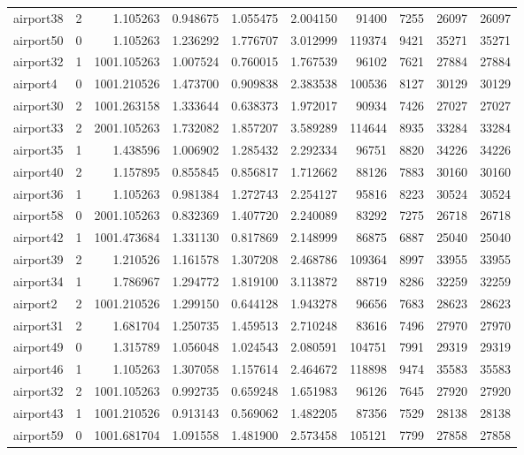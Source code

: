\begin{longtable}{|l|r|r|r|r|r|r|r|r|r|}
airport38 & 2 & 1.105263 & 0.948675 & 1.055475 & 2.004150 & 91400 & 7255 & 26097 & 26097 \\
airport50 & 0 & 1.105263 & 1.236292 & 1.776707 & 3.012999 & 119374 & 9421 & 35271 & 35271 \\
airport32 & 1 & 1001.105263 & 1.007524 & 0.760015 & 1.767539 & 96102 & 7621 & 27884 & 27884 \\
airport4 & 0 & 1001.210526 & 1.473700 & 0.909838 & 2.383538 & 100536 & 8127 & 30129 & 30129 \\
airport30 & 2 & 1001.263158 & 1.333644 & 0.638373 & 1.972017 & 90934 & 7426 & 27027 & 27027 \\
airport33 & 2 & 2001.105263 & 1.732082 & 1.857207 & 3.589289 & 114644 & 8935 & 33284 & 33284 \\
airport35 & 1 & 1.438596 & 1.006902 & 1.285432 & 2.292334 & 96751 & 8820 & 34226 & 34226 \\
airport40 & 2 & 1.157895 & 0.855845 & 0.856817 & 1.712662 & 88126 & 7883 & 30160 & 30160 \\
airport36 & 1 & 1.105263 & 0.981384 & 1.272743 & 2.254127 & 95816 & 8223 & 30524 & 30524 \\
airport58 & 0 & 2001.105263 & 0.832369 & 1.407720 & 2.240089 & 83292 & 7275 & 26718 & 26718 \\
airport42 & 1 & 1001.473684 & 1.331130 & 0.817869 & 2.148999 & 86875 & 6887 & 25040 & 25040 \\
airport39 & 2 & 1.210526 & 1.161578 & 1.307208 & 2.468786 & 109364 & 8997 & 33955 & 33955 \\
airport34 & 1 & 1.786967 & 1.294772 & 1.819100 & 3.113872 & 88719 & 8286 & 32259 & 32259 \\
airport2 & 2 & 1001.210526 & 1.299150 & 0.644128 & 1.943278 & 96656 & 7683 & 28623 & 28623 \\
airport31 & 2 & 1.681704 & 1.250735 & 1.459513 & 2.710248 & 83616 & 7496 & 27970 & 27970 \\
airport49 & 0 & 1.315789 & 1.056048 & 1.024543 & 2.080591 & 104751 & 7991 & 29319 & 29319 \\
airport46 & 1 & 1.105263 & 1.307058 & 1.157614 & 2.464672 & 118898 & 9474 & 35583 & 35583 \\
airport32 & 2 & 1001.105263 & 0.992735 & 0.659248 & 1.651983 & 96126 & 7645 & 27920 & 27920 \\
airport43 & 1 & 1001.210526 & 0.913143 & 0.569062 & 1.482205 & 87356 & 7529 & 28138 & 28138 \\
airport59 & 0 & 1001.681704 & 1.091558 & 1.481900 & 2.573458 & 105121 & 7799 & 27858 & 27858 \\

\end{longtable}
